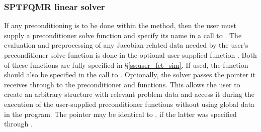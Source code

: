 \subsubsection{SPTFQMR linear solver}\label{sss:optin_sptfqmr}
If any preconditioning is to be done within the {\sptfqmr} method,
then the user must supply a preconditioner solve function 
and specify its name in a call to .
The evaluation and preprocessing of any Jacobian-related data needed
by the user's preconditioner solve function is done in the optional
user-supplied function . Both of these functions are
fully specified in \S\ref{ss:user_fct_sim}.
If used, the  function should also be specified in the call to
.
Optionally, the {\cvsptfqmr} solver passes the pointer  it
receives through  to the preconditioner
 and  functions.  This allows the user to create
an arbitrary structure with relevant problem data and access it during
the execution of the user-supplied preconditioner functions without using
global data in the program.  The pointer  may be identical
to , if the latter was specified through .

